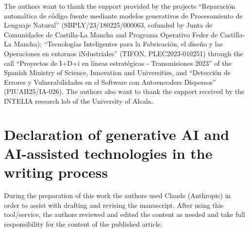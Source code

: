 \documentclass[preprint,12pt, a4paper]{elsarticle}
\begin{document}
The authors want to thank the support provided by the projects ``Reparación
automática de código fuente mediante modelos generativos de Procesamiento de
Lenguaje Natural'' (SBPLY/23/180225/000063, cofunded by Junta de Comunidades
de Castilla-La Mancha and Programa Operativo Feder de Castilla-La Mancha);
``Tecnologías Inteligentes para la Fabricación, el diseño y las Operaciones en
entornos iNdustriales'' (TIFON, PLEC2023-010251) through the call ``Proyectos
de I+D+i en líneas estratégicas - Transmisiones 2023'' of the Spanish Ministry
of Science, Innovation and Universities, and ``Detección de Errores y
Vulnerabilidades en el Software con Autoencoders Dispersos'' (PIUAH25/IA-026).
The authors also want to thank the support received by the INTELIA research
lab of the University of Alcala.

\section*{Declaration of generative AI and AI-assisted technologies in the
writing process}

During the preparation of this work the authors used Claude (Anthropic) in
order to assist with drafting and revising the manuscript. After using this
tool/service, the authors reviewed and edited the content as needed and take
full responsibility for the content of the published article.




\end{document}
